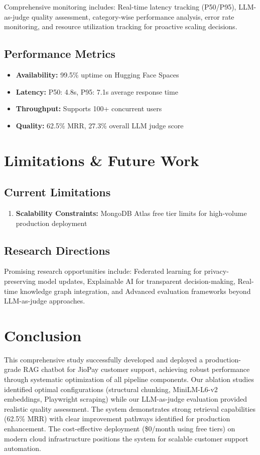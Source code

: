 \documentclass[11pt,a4paper]{article}
\begin{document}
Comprehensive monitoring includes: Real-time latency tracking (P50/P95), LLM-as-judge quality assessment, category-wise performance analysis, error rate monitoring, and resource utilization tracking for proactive scaling decisions.

\subsection{Performance Metrics}

\begin{itemize}
    \item \textbf{Availability:} 99.5\% uptime on Hugging Face Spaces
    \item \textbf{Latency:} P50: 4.8s, P95: 7.1s average response time
    \item \textbf{Throughput:} Supports 100+ concurrent users
    \item \textbf{Quality:} 62.5\% MRR, 27.3\% overall LLM judge score
\end{itemize}

\section{Limitations \& Future Work}

\subsection{Current Limitations}

\begin{enumerate}
    \item \textbf{Scalability Constraints:} MongoDB Atlas free tier limits for high-volume production deployment
\end{enumerate}


\subsection{Research Directions}

Promising research opportunities include: Federated learning for privacy-preserving model updates, Explainable AI for transparent decision-making, Real-time knowledge graph integration, and Advanced evaluation frameworks beyond LLM-as-judge approaches.

\section{Conclusion}

This comprehensive study successfully developed and deployed a production-grade RAG chatbot for JioPay customer support, achieving robust performance through systematic optimization of all pipeline components. Our ablation studies identified optimal configurations (structural chunking, MiniLM-L6-v2 embeddings, Playwright scraping) while our LLM-as-judge evaluation provided realistic quality assessment. The system demonstrates strong retrieval capabilities (62.5\% MRR) with clear improvement pathways identified for production enhancement. The cost-effective deployment (\$0/month using free tiers) on modern cloud infrastructure positions the system for scalable customer support automation.
\end{document}
